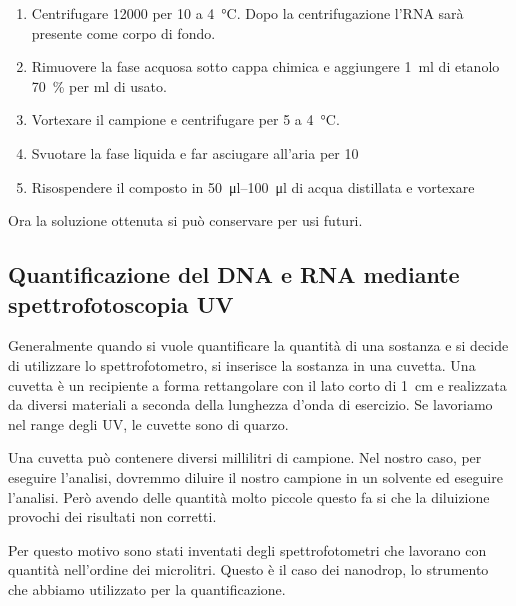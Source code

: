 \begin{enumerate}
	\item Centrifugare \qty{12000}{\giri} per \qty{10}{\min} a \qty{4}{\celsius}. Dopo la centrifugazione l’RNA sarà presente come corpo di fondo.
	\item Rimuovere la fase acquosa sotto cappa chimica e aggiungere \qty{1}{ml} di etanolo \qty{70}{\percent} per \unit{\ml} di \trizol usato.
	\item Vortexare il campione e centrifugare per \qty{5}{\min} a \qty{4}{\celsius}.
	\item Svuotare la fase liquida e far asciugare all’aria per \qty{10}{\min}
	\item Risospendere il composto in \qtyrange{50}{100}{\micro\litre} di acqua distillata e vortexare	
\end{enumerate}
Ora la soluzione ottenuta si può conservare per usi futuri.

\subsection{Quantificazione del DNA e RNA mediante spettrofotoscopia UV}
\begin{Informazione}
	Generalmente quando si vuole quantificare la quantità di una sostanza e si decide di utilizzare lo spettrofotometro, si inserisce la sostanza in una cuvetta. Una cuvetta è un recipiente a forma rettangolare con il lato corto di \qty{1}{cm} e realizzata da diversi materiali a seconda della lunghezza d'onda di esercizio. Se lavoriamo nel range degli UV, le cuvette sono di quarzo.

	Una cuvetta può contenere diversi millilitri di campione. Nel nostro caso, per eseguire l'analisi, dovremmo diluire il nostro campione in un solvente ed eseguire l'analisi. Però avendo delle quantità molto piccole questo fa si che la diluizione provochi dei risultati non corretti. 

	Per questo motivo sono stati inventati degli spettrofotometri che lavorano con quantità nell'ordine dei microlitri. Questo è il caso dei nanodrop, lo strumento che abbiamo utilizzato per la quantificazione.
\end{Informazione}

